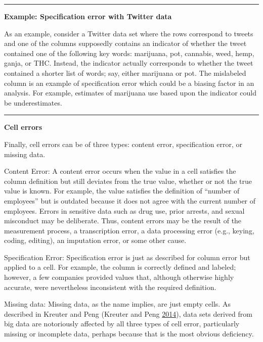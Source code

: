 \documentclass[]{krantz}
\begin{document}
\begin{center}\rule{0.5\linewidth}{\linethickness}\end{center}

\textbf{Example: Specification error with Twitter data}

As an example, consider a Twitter data set where the rows correspond to
tweets and one of the columns supposedly contains an indicator of
whether the tweet contained one of the following key words: marijuana,
pot, cannabis, weed, hemp, ganja, or THC. Instead, the indicator
actually corresponds to whether the tweet contained a shorter list of
words; say, either marijuana or pot. The mislabeled column is an example
of specification error which could be a biasing factor in an analysis.
For example, estimates of marijuana use based upon the indicator could
be underestimates.

\begin{center}\rule{0.5\linewidth}{\linethickness}\end{center}

\textbf{Cell errors}

Finally, cell errors can be of three types: content error, specification
error, or missing data.

Content Error: A content error occurs when the value in a cell satisfies
the column definition but still deviates from the true value, whether or
not the true value is known. For example, the value satisfies the
definition of ``number of employees'' but is outdated because it does
not agree with the current number of employees. Errors in sensitive data
such as drug use, prior arrests, and sexual misconduct may be
deliberate. Thus, content errors may be the result of the measurement
process, a transcription error, a data processing error (e.g., keying,
coding, editing), an imputation error, or some other cause.

Specification Error: Specification error is just as described for column
error but applied to a cell. For example, the column is correctly
defined and labeled; however, a few companies provided values that,
although otherwise highly accurate, were nevertheless inconsistent with
the required definition.

Missing data: Missing data, as the name implies, are just empty cells.
As described in Kreuter and Peng (Kreuter and Peng
\protect\hyperlink{ref-kreuter201412}{2014}), data sets derived from big
data are notoriously affected by all three types of cell error,
particularly missing or incomplete data, perhaps because that is the
most obvious deficiency.
\end{document}
